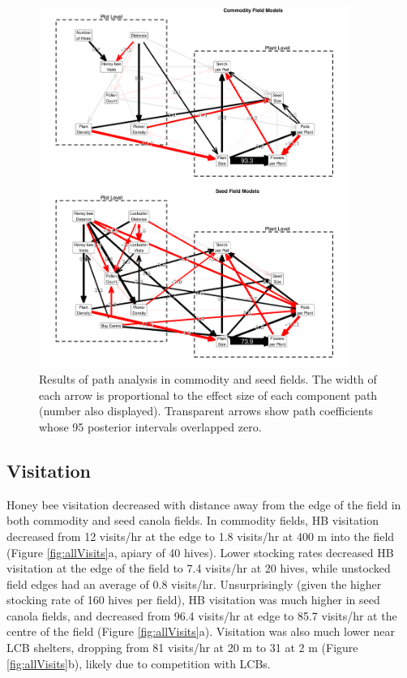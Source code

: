 \documentclass[12pt]{article} %
\begin{document}
\begin{figure}
    \centering
    \includegraphics[width=0.9\textwidth,keepaspectratio=true]{../Figures/allSEM.png}
    \caption{Results of path analysis in commodity and seed fields. The width of each arrow is proportional to the effect size of each component path (number also displayed). Transparent arrows show path coefficients whose 95 posterior intervals overlapped zero.}
    \label{fig:allSEM}
\end{figure}


\subsection{Visitation}

Honey bee visitation decreased with distance away from the edge of the field in both commodity and seed canola fields.
In commodity fields, HB visitation decreased from 12 visits/hr at the edge to 1.8 visits/hr at 400 m into the field (Figure \ref{fig:allVisits}a, apiary of 40 hives).
Lower stocking rates decreased HB visitation at the edge of the field to 7.4 visits/hr at 20 hives, while unstocked field edges had an average of 0.8 visits/hr.
Unsurprisingly (given the higher stocking rate of 160 hives per field), HB visitation was much higher in seed canola fields, and decreased from 96.4 visits/hr at edge to 85.7 visits/hr at the centre of the field (Figure \ref{fig:allVisits}a). 
Visitation was also much lower near LCB shelters, dropping from 81 visits/hr at 20 m to 31 at 2 m (Figure \ref{fig:allVisits}b), likely due to competition with LCBs.
\end{document}
